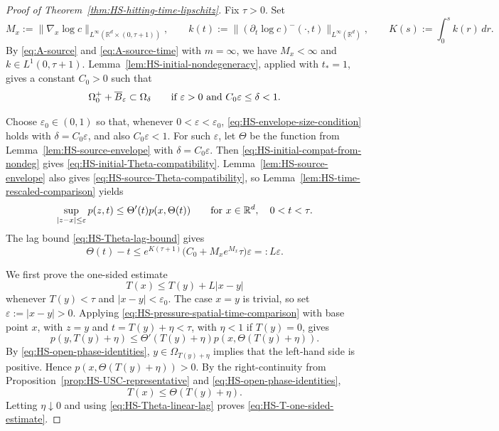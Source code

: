 \documentclass[11pt]{amsart}
\numberwithin{equation}{section}
\numberwithin{figure}{section}
\theoremstyle{plain}
\theoremstyle{definition}
\theoremstyle{remark}
\theoremstyle{plain}
\newcommand{\abs}[1]{\lvert #1 \rvert}
\newcommand{\norm}[1]{\lVert #1 \rVert}
\newcommand{\vep}{\varepsilon}
\def\R{\mathbb{R}}
\begin{document}
\begin{proof}[Proof of Theorem~\ref{thm:HS-hitting-time-lipschitz}]
Fix \(\tau>0\).  Set
\begin{equation}\label{eq:HS-Lip-proof-M-k}
    M_x:=\norm{\nabla_x\log c}_{L^\infty(\R^d\times(0,\tau+1))},
    \qquad
    k(t):=\norm{(\partial_t\log c)^-(\cdot,t)}_{L^\infty(\R^d)},
    \qquad
    K(s):=\int_0^s k(r)\,dr .
\end{equation}
By \eqref{eq:A-source} and \eqref{eq:A-source-time} with \(m=\infty\),
we have \(M_x<\infty\) and
\(k\in L^1(0,\tau+1)\).
Lemma~\ref{lem:HS-initial-nondegeneracy}, applied with \(t_*=1\), gives a
constant \(C_0>0\) such that
\begin{equation}\label{eq:HS-initial-compat-from-nondeg}
    \Omega_0^{+}+\overline B_\vep\subset\Omega_\delta
    \qquad\hbox{if }\vep>0
    \hbox{ and } C_0\vep\leq\delta<1 .
\end{equation}

Choose \(\vep_0\in (0,1)\) so that, whenever \(0<\vep<\vep_0\),
\eqref{eq:HS-envelope-size-condition} holds with \(\delta=C_0\vep\), and also
\(C_0\vep<1\).  For such \(\vep\), let \(\Theta\) be the
function from Lemma~\ref{lem:HS-source-envelope} with \(\delta=C_0\vep\).  Then
\eqref{eq:HS-initial-compat-from-nondeg} gives
\eqref{eq:HS-initial-Theta-compatibility}.  Lemma~\ref{lem:HS-source-envelope}
also gives \eqref{eq:HS-source-Theta-compatibility}, so
Lemma~\ref{lem:HS-time-rescaled-comparison} yields
\begin{equation}\label{eq:HS-pressure-spatial-time-comparison}
    \sup_{\abs{z-x}\leq\vep}p(z,t)
    \leq \Theta'(t)p(x,\Theta(t))
    \qquad\hbox{for }x\in\R^d,\quad 0<t<\tau.
\end{equation}
The lag bound \eqref{eq:HS-Theta-lag-bound} gives
\begin{equation}\label{eq:HS-Theta-linear-lag}
    \Theta(t)-t
    \leq e^{K(\tau+1)}
    \bigl(C_0+M_xe^{M_x}\tau\bigr)\vep
    =:L\vep .
\end{equation}

We first prove the one-sided estimate
\begin{equation}\label{eq:HS-T-one-sided-estimate}
    T(x)\leq T(y)+L\abs{x-y}
\end{equation}
whenever \(T(y)<\tau\) and \(\abs{x-y}<\vep_0\).  The case \(x=y\) is
trivial, so set \(\vep:=\abs{x-y}>0\).  Applying
\eqref{eq:HS-pressure-spatial-time-comparison} with base point \(x\), with
\(z=y\) and \(t=T(y)+\eta<\tau\), with \(\eta<1\) if \(T(y)=0\), gives
\[
    p(y,T(y)+\eta)\leq \Theta'(T(y)+\eta)p(x,\Theta(T(y)+\eta)).
\]
By \eqref{eq:HS-open-phase-identities}, \(y\in\Omega_{T(y)+\eta}\)
implies that the left-hand side is positive.  Hence
\(p(x,\Theta(T(y)+\eta))>0\). By the right-continuity from
Proposition~\ref{prop:HS-USC-representative} and \eqref{eq:HS-open-phase-identities},
\[
    T(x)\leq\Theta(T(y)+\eta).
\]
Letting \(\eta\downarrow0\) and using \eqref{eq:HS-Theta-linear-lag} proves
\eqref{eq:HS-T-one-sided-estimate}.


\end{proof}
\end{document}
